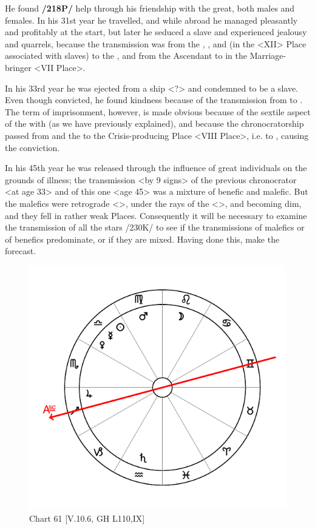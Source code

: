 He found \textbf{/218P/} help through his friendship with the great, both males and females. In his 31st year he travelled, and while abroad he managed pleasantly and profitably at the start, but later he seduced a slave and experienced jealousy and quarrels, because the transmission was from the \Sun, \Venus, and \Mars (in the <XII> Place associated with slaves) to the \Moon, and from the Ascendant to \Jupiter\xspace in the Marriage-bringer <VII Place>. 

In his 33rd year he was ejected from a ship <?> and condemned to be a slave. Even though convicted, he found kindness because
of the transmission from \Mercury\xspace to \Jupiter. The term of imprisonment, however, is made obvious because of the sextile aspect of the \Moon\xspace with \Saturn\xspace (as we have previously explained), and because the chronocratorship passed from \Mars\xspace and the \Sun to the Crisis-producing Place <VIII Place>, i.e. to \Saturn, causing the conviction. 

In his 45th year he was released through the influence of great individuals on the grounds of illness; the transmission <by 9 signs> of the previous chronocrator <at age 33> and of this one <age 45> was a mixture of benefic and malefic. But the malefics were retrograde <\Saturn>, under the rays of the \Sun\xspace <\Mars>, and becoming dim, and they fell in rather weak Places.
Consequently it will be necessary to examine the transmission of all the stars /230K/ to see if the transmissions of malefics or of benefics predominate, or if they are mixed. Having done this, make the forecast. 

\begin{figure}
\centering
\vspace{-20pt}
\includegraphics[width=.68\textwidth]{charts/5_10_06}
\caption{Chart 61 [V.10.6, GH L110,IX]}
\label{fig:chart61}
\end{figure}

